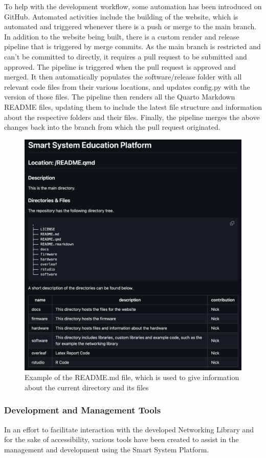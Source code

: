 To help with the development workflow, some automation has been introduced on GitHub. Automated activities include the building of the website, which is automated and triggered whenever there is a push or merge to the main branch. In addition to the website being built, there is a custom render and release pipeline that is triggered by merge commits. As the main branch is restricted and can't be committed to directly, it requires a pull request to be submitted and approved. The pipeline is triggered when the pull request is approved and merged. It then automatically populates the software/release folder with all relevant code files from their various locations, and updates config.py with the version of those files. The pipeline then renders all the Quarto Markdown README files, updating them to include the latest file structure and information about the respective folders and their files. Finally, the pipeline merges the above changes back into the branch from which the pull request originated.

\begin{figure}[H]
    \centering
    \includegraphics[width=0.5\linewidth]{overleaf/images/readme.png}
    \vspace{\ftspace}
    \caption{Example of the README.md file, which is used to give information about the current directory and its files}
    \vspace{\ftspace}
    \label{fig:readme}
\end{figure}

\subsubsection{\label{sec:methods_pyscript}Development and Management Tools}

In an effort to facilitate interaction with the developed Networking Library and for the sake of accessibility, various tools have been created to assist in the management and development using the Smart System Platform.\\

